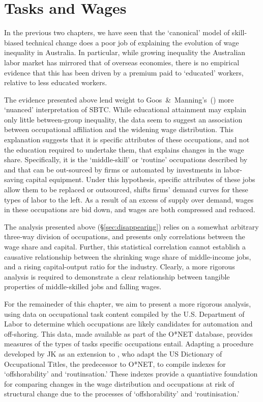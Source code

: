 
\section{Tasks and Wages}

In the previous two chapters, we have seen that the `canonical' model of skill-biased technical change does a poor job of explaining the evolution of wage inequality in Australia. In particular, while growing inequality the Australian labor market has mirrored that of overseas economies, there is no empirical evidence that this has been driven by a premium paid to `educated' workers, relative to less educated workers. 

The evidence presented above lend weight to Goos~\&~Manning's~(\citeyear{Goos2007}) more `nuanced' interpretation of SBTC. While educational attainment may explain only little between-group inequality, the data seem to suggest an association between occupational affiliation and the widening wage distribution. This explanation suggests that it is specific attributes of these occupations, and not the education required to undertake them, that explains changes in the wage share. Specifically, it is the `middle-skill' or `routine' occupations described by \citet{Levy2003} and \citet{Goos2009} that can be out-sourced by firms or automated by investments in labor-saving capital equipment. Under this hypothesis, specific attributes of these jobs allow them to be replaced or outsourced, shifts firms' demand curves for these types of labor to the left. As a result of an excess of supply over demand, wages in these occupations are bid down, and wages are both compressed and reduced. 

The analysis presented above (\S\ref{sec:disappearing}) relies on a somewhat arbitrary three-way division of occupations, and presents only correlations between the wage share and capital. Further, this statistical correlation cannot establish a causative relationship between the shrinking wage share of middle-income jobs, and a rising capital-output ratio for the industry. Clearly, a more rigorous analysis is required to demonstrate a clear relationship between tangible properties of middle-skilled jobs and falling wages.

For the remaineder of this chapter, we aim to present a more rigorous analysis, using data on occupational task content compiled by the U.S. Department of Labor to determine which occupations are likely candidates for automation and off-shoring. This data, made available as part of the O*NET database, provides measures of the types of tasks specific occupations entail. Adapting a procedure developed by JK as an extension to \citet{Levy2003}, who adapt the US Dictionary of Occupational Titles, the predecessor to O*NET, to compile indexes for `offshorability' and `routinsation.' These indexes provide a quantiative foundation for comparing changes in the wage distribution and occupations at risk of structural change due to the processes of `offshorability' and `routinisation.'

